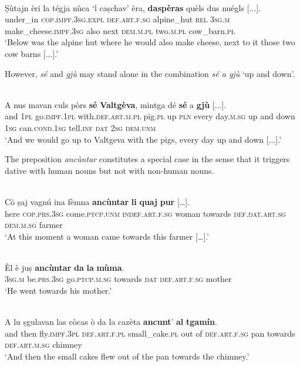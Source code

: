 \ea
\label{}
\\
\gll Ṣùtajn èri la tégja nùca `l caṣchav' èra, \textbf{daspèras} quèls dus nuégls [...].\\
under\_in \textsc{cop.impf.3sg.expl} \textsc{def.art.f.sg} alpine\_hut \textsc{rel} \textsc{3sg.m} make\_cheese.\textsc{impf.3sg} also next \textsc{dem.m.pl} two.\textsc{m.pl} cow\_barn.\textsc{pl} \\
\glt `Below was the alpine hut where he would also make cheese, next to it those two cow barns [...].'
\z

However, \textit{sé} and \textit{gjù} may stand alone in the combination \textit{sé a gjù} `up and down'.

\ea
\label{}
\\
\gll    A nus mavan culs pòrs \textbf{sé} \textbf{Valtgèva}, mintga dé \textbf{sé} a \textbf{gjù} [...].\\
and\textbf{} \textsc{1pl}  go.\textsc{impf.1pl} with.\textsc{def.art.m.pl} pig.\textsc{pl} up \textsc{pln} every day.\textsc{m.sg} up and down  \textsc{1sg}  can.\textsc{cond.1sg}  tell.\textsc{inf}  \textsc{dat}  \textsc{2sg} \textsc{dem.unm}\\
\glt `And we would go up to Valtgeva with the pigs, every day up and down [...].'
\z

The preposition \textit{ancùntar} constitutes a special case in the sense that it triggers dative with human nouns but not with non-human nouns.

\ea
\label{}
\\
\gll Cò ṣaj	vagnú	ina fèmna \textbf{ancùntar} \textbf{li}	\textbf{quaj} \textbf{pur} […].\\
here \textsc{cop.prs.3sg} come.\textsc{ptcp.unm} \textsc{indef.art.f.sg} woman towards \textsc{def.dat.art.sg} \textsc{dem.m.sg} farmer \\
\glt `At this moment a woman came towards this farmer […].'
\z

\ea
\label{}
\\
\gll Èl è juṣ \textbf{ancùntar} \textbf{da} \textbf{la} \textbf{mùma}.\\
\textsc{3sg.m} be.\textsc{prs.3sg} go.\textsc{ptcp.m.sg} towards \textsc{dat} \textsc{def.art.f.sg} mother\\
\glt `He went towards his mother.'
\z

\ea
\label{}
\\
\gll A lu ṣgulavan las còcas ò da la cazèta \textbf{ancunt}' \textbf{al} \textbf{tgamín}.\\
and then fly.\textsc{impf.3pl} \textsc{def.art.f.pl} small\_cake.\textsc{pl} out of \textsc{def.art.f.sg} pan towards \textsc{def.art.m.sg} chimney\\
\glt `And then the small cakes flew out of the pan towards the chimney.'
\z

